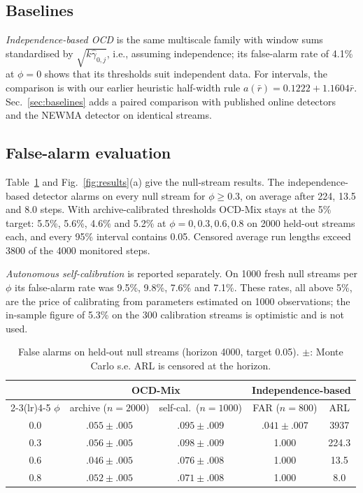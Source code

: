 \documentclass[conference]{IEEEtran}
\begin{document}
\subsection{Baselines}
\emph{Independence-based OCD} is the same multiscale family with window sums standardised by $\sqrt{k\hat\gamma_{0,j}}$, i.e., assuming independence; its false-alarm rate of 4.1\% at $\phi=0$ shows that its thresholds suit independent data. For intervals, the comparison is with our earlier heuristic half-width rule $a(\bar r)=0.1222+1.1604\bar r$. Sec.~\ref{sec:baselines} adds a paired comparison with published online detectors~\cite{chen2022,chen2024,kalinke2025} and the NEWMA detector on identical streams.

\subsection{False-alarm evaluation}\label{sec:far}
Table~\ref{tab:far} and Fig.~\ref{fig:results}(a) give the null-stream results. The independence-based detector alarms on every null stream for $\phi\ge 0.3$, on average after 224, 13.5 and 8.0 steps. With archive-calibrated thresholds OCD-Mix stays at the 5\% target: 5.5\%, 5.6\%, 4.6\% and 5.2\% at $\phi=0,0.3,0.6,0.8$ on 2000 held-out streams each, and every 95\% interval contains 0.05. Censored average run lengths exceed 3800 of the 4000 monitored steps.

\emph{Autonomous self-calibration} is reported separately. On 1000 fresh null streams per $\phi$ its false-alarm rate was 9.5\%, 9.8\%, 7.6\% and 7.1\%. These rates, all above 5\%, are the price of calibrating from parameters estimated on 1000 observations; the in-sample figure of 5.3\% on the 300 calibration streams is optimistic and is not used.

\begin{table}[t]
\centering
\caption{False alarms on held-out null streams (horizon 4000, target 0.05). $\pm$: Monte Carlo s.e. ARL is censored at the horizon.}
\label{tab:far}
\small
\setlength{\tabcolsep}{3.5pt}
\begin{tabular}{@{}ccccc@{}}
\toprule
& \multicolumn{2}{c}{OCD-Mix} & \multicolumn{2}{c}{Independence-based}\\
\cmidrule(lr){2-3}\cmidrule(lr){4-5}
$\phi$ & archive ($n{=}2000$) & self-cal.\ ($n{=}1000$) & FAR ($n{=}800$) & ARL\\
\midrule
0.0 & $.055\pm.005$ & $.095\pm.009$ & $.041\pm.007$ & 3937\\
0.3 & $.056\pm.005$ & $.098\pm.009$ & 1.000 & 224.3\\
0.6 & $.046\pm.005$ & $.076\pm.008$ & 1.000 & 13.5\\
0.8 & $.052\pm.005$ & $.071\pm.008$ & 1.000 & 8.0\\
\bottomrule
\end{tabular}
\end{table}
\end{document}

